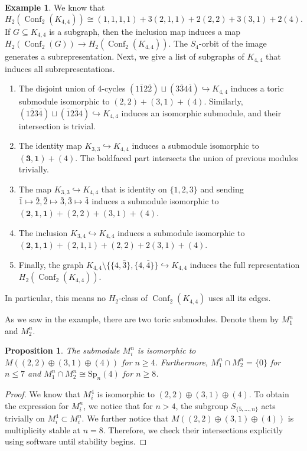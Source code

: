\documentclass[12pt]{amsart}
\newtheorem{prop}[thm]{Proposition}
\theoremstyle{definition}
\newtheorem{example}[thm]{Example}
\newcommand{\conf}{\operatorname{Conf}}
\newcommand{\Sp}{\mathrm{Sp}}
\begin{document}
\begin{example}
We know that \[H_2(\conf_2(K_{4,4}))\cong (1,1,1,1)+3(2,1,1)+2(2,2)+3(3,1)+2(4).\] If $G\subseteq K_{4,4}$ is a subgraph, then the inclusion map induces a map $H_2(\conf_2(G))\to H_2(\conf_2(K_{4,4}))$. The $S_4$-orbit of the image generates a subrepresentation. Next, we give a list of subgraphs of $K_{4,4}$ that induces all subrepresentations.
\begin{enumerate}
    \item The disjoint union of 4-cycles $(1\bar12\bar2)\sqcup(3\bar34\bar4)\hookrightarrow K_{4,4}$ induces a toric submodule isomorphic to $(2,2)+(3,1)+(4)$. Similarly, $(1\bar23\bar4)\sqcup(\bar12\bar34)\hookrightarrow K_{4,4}$ induces an isomorphic submodule, and their intersection is trivial.
    \item The identity map $K_{3,3}\hookrightarrow K_{4,4}$ induces a submodule isomorphic to $\mathbf{(3,1)} + (4)$. The boldfaced part intersects the union of previous modules trivially.
    \item The map $K_{3,3}\hookrightarrow K_{4,4}$ that is identity on $\{1,2,3\}$ and sending $\bar1\mapsto \bar2,\bar2\mapsto \bar3,\bar3\mapsto \bar4$ induces a submodule isomorphic to $\mathbf{(2, 1, 1)} + (2, 2) + (3, 1) + (4)$.
    \item The inclusion $K_{3,4}\hookrightarrow K_{4,4}$ induces a submodule isomorphic to $\mathbf{(2, 1, 1)} + (2,1,1)+(2, 2) + 2(3, 1) + (4)$.
    \item Finally, the graph $K_{4,4}\setminus\{\{4,\bar3\},\{4,\bar4\}\}\hookrightarrow K_{4,4}$ induces the full representation $H_2(\conf_2(K_{4,4}))$.
\end{enumerate}
In particular, this means no $H_2$-class of $\conf_2(K_{4,4})$ uses all its edges.
\end{example}

As we saw in the example, there are two toric submodules. Denote them by $M_1^n$ and $M_2^n$.

\begin{prop}\label{prop: triv in Knn}
The submodule $M_i^n$ is isomorphic to $M((2,2)\oplus(3,1)\oplus(4))$ for $n\geq 4$. Furthermore, $M_1^n\cap M_2^n = \{0\}$ for $n\leq 7$ and $M_1^n\cap M_2^n \cong \Sp_n(4)$ for $n\geq 8$.
\end{prop}

\begin{proof}
We know that $M_i^4$ is isomorphic to $(2,2)\oplus(3,1)\oplus(4)$. To obtain the expression for $M_i^n$, we notice that for $n>4$, the subgroup $S_{\{5,\dots,n\}}$ acts trivially on $M_i^4\subset M_i^n$. We further notice that $M((2,2)\oplus(3,1)\oplus(4))$ is multiplicity stable at $n=8$. Therefore, we check their intersections explicitly using software until stability begins.
\end{proof}
\end{document}
